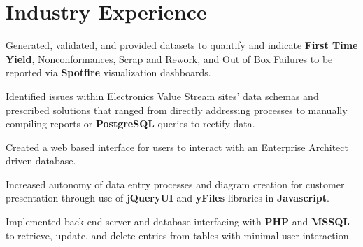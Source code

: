 \documentclass[letterpaper]{deedy-resume} %
\begin{document}
\begin{minipage}[t]{0.66\textwidth} %


\section{Industry Experience}



\vspace{\topsep} %
\begin{tightitemize}
\item  Generated, validated, and provided datasets to quantify and indicate \textbf{First Time Yield}, Nonconformances, Scrap and Rework, and Out of Box Failures to be reported via \textbf{Spotfire} visualization dashboards.
\item Identified issues within Electronics Value Stream sites' data schemas and prescribed solutions that ranged from directly addressing processes to manually compiling reports or \textbf{PostgreSQL} queries to rectify data.
\end{tightitemize}

\begin{tightitemize}
\item Created a web based interface for users to interact with an Enterprise Architect driven database.
\item Increased autonomy of data entry processes and diagram creation for customer presentation through use of \textbf{jQueryUI} and \textbf{yFiles} libraries in \textbf{Javascript}.
\item Implemented back-end server and database interfacing with \textbf{PHP} and \textbf{MSSQL} to retrieve, update, and delete entries from tables with minimal user interaction.
\end{tightitemize}


\end{minipage}
\end{document}
